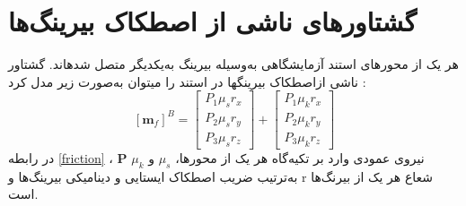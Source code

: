 \section{گشتاورهای ناشی از اصطكاک بیرينگ‌ها}
هر یک از محورهای استند آزمایشگاهی به‌وسیله بیرینگ به‌یکدیگر متصل شدهاند. گشتاور ناشی ازاصطکاک بیرینگها در استند را میتوان به‌صورت زیر مدل کرد
\cite{Arabolye}
:
\begin{equation}\label{friction}
	[\boldsymbol m_f]^B = \begin{bmatrix}
		P_1\mu_sr_x \\
		P_2\mu_sr_y \\
		P_3\mu_sr_z
	\end{bmatrix} + \begin{bmatrix}
	P_1\mu_kr_x \\
	P_2\mu_kr_y \\
	P_3\mu_kr_z
\end{bmatrix}
\end{equation}
در رابطه \ref{friction}
 ، $\boldsymbol P$ نیروی عمودی وارد بر تکیه‌گاه هر یک از محورها، $\mu_s$ و $\mu_k$ به‌ترتیب ضریب اصطکاک
ایستایی و دینامیکی بیرینگ‌ها و r شعاع هر یک از بیرنگ‌ها است.

